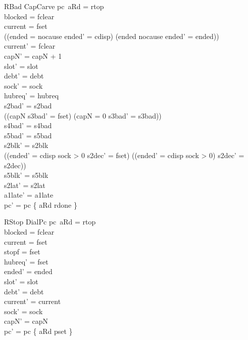 \documentclass[a4paper,10pt,fleqn]{article}
\begin{document}
\begin{schema}{RBad}
  CapCarve
\where
  pc~aRd = rtop \\
  blocked = fclear \\
  current = fset \\
  ((ended = nocause \land ended' = cdisp) \lor (ended \neq nocause \land ended' = ended)) \\
  current' = fclear \\
  capN' = capN + 1 \\
  slot' = slot \\
  debt' = debt \\
  sock' = sock \\
  hubreq' = hubreq \\
  s2bad' = s2bad \\
  ((capN  \land s3bad' = fset) \lor (capN = 0 \land s3bad' = s3bad)) \\
  s4bad' = s4bad \\
  s5bad' = s5bad \\
  s2blk' = s2blk \\
  ((ended' = cdisp \land sock > 0 \land s2dec' = fset) \lor
    (\lnot (ended' = cdisp \land sock > 0) \land s2dec' = s2dec)) \\
  s5blk' = s5blk \\
  s2lat' = s2lat \\
  a1late' = a1late \\
  pc' = pc \oplus \{ aRd \mapsto rdone \}
\end{schema}

\begin{schema}{RStop}
  DialPc
\where
  pc~aRd = rtop \\
  blocked = fclear \\
  current = fset \\
  stopf = fset \\
  hubreq' = fset \\
  ended' = ended \\
  slot' = slot \\
  debt' = debt \\
  current' = current \\
  sock' = sock \\
  capN' = capN \\
  pc' = pc \oplus \{ aRd \mapsto pset \}
\end{schema}
\end{document}
